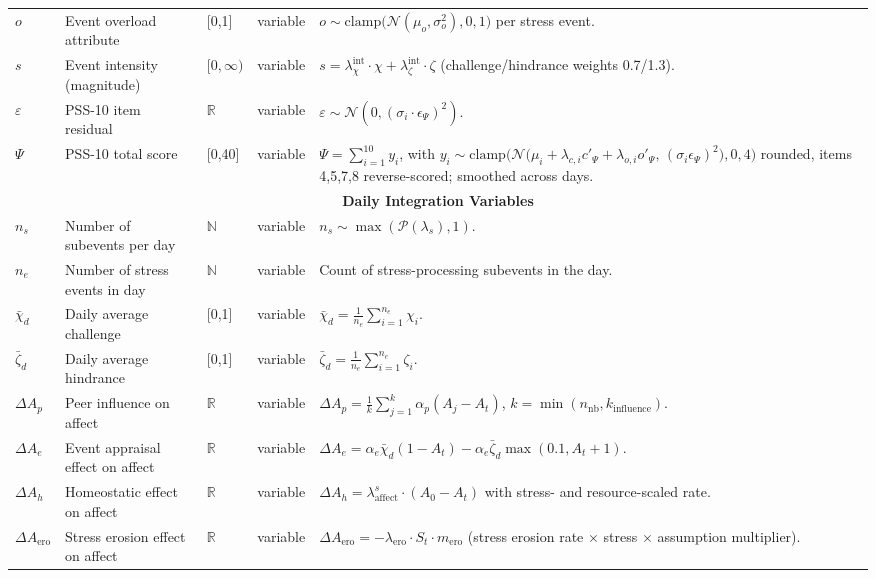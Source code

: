 \documentclass[
  letterpaper,
  DIV=11,
  numbers=noendperiod]{scrartcl}
\begin{document}
\begin{longtable}{lp{2.4cm}p{1.6cm}p{1.7cm}p{5.2cm}}
$o$ & Event overload attribute & [0,1] & variable & $o \sim \mathrm{clamp}\big(\mathcal{N}(\mu_o, \sigma_o^2), 0, 1\big)$ per stress event. \\
$s$ & Event intensity (magnitude) & $[0,\infty)$ & variable & $s = \lambda_{\chi}^{\mathrm{int}} \cdot \chi + \lambda_{\zeta}^{\mathrm{int}} \cdot \zeta$ (challenge/hindrance weights 0.7/1.3). \\
$\varepsilon$ & PSS-10 item residual & $\mathbb{R}$ & variable & $\varepsilon \sim \mathcal{N}(0, (\sigma_i \cdot \epsilon_{\Psi})^2)$. \\
$\Psi$ & PSS-10 total score & [0,40] & variable & $\Psi = \sum_{i=1}^{10} y_i$, with $y_i \sim \mathrm{clamp}\big(\mathcal{N}\big(\mu_i + \lambda_{c,i}c'_\Psi + \lambda_{o,i}o'_\Psi,\, (\sigma_i \epsilon_{\Psi})^2\big), 0, 4\big)$ rounded, items 4,5,7,8 reverse-scored; smoothed across days. \\
\midrule
\multicolumn{5}{c}{\textbf{Daily Integration Variables}} \\
\midrule
$n_s$ & Number of subevents per day & $\mathbb{N}$ & variable & $n_s \sim \max(\mathcal{P}(\lambda_s), 1)$. \\
$n_e$ & Number of stress events in day & $\mathbb{N}$ & variable & Count of stress-processing subevents in the day. \\
$\bar{\chi}_d$ & Daily average challenge & [0,1] & variable & $\bar{\chi}_d = \frac{1}{n_e}\sum_{i=1}^{n_e}\chi_i$. \\
$\bar{\zeta}_d$ & Daily average hindrance & [0,1] & variable & $\bar{\zeta}_d = \frac{1}{n_e}\sum_{i=1}^{n_e}\zeta_i$. \\
$\Delta A_p$ & Peer influence on affect & $\mathbb{R}$ & variable & $\Delta A_p = \frac{1}{k}\sum_{j=1}^{k} \alpha_p (A_j - A_t)$, $k = \min(n_{\mathrm{nb}}, k_{\mathrm{influence}})$. \\
$\Delta A_e$ & Event appraisal effect on affect & $\mathbb{R}$ & variable & $\Delta A_e = \alpha_e \bar{\chi}_d (1 - A_t) - \alpha_e \bar{\zeta}_d \max(0.1, A_t + 1)$. \\
$\Delta A_h$ & Homeostatic effect on affect & $\mathbb{R}$ & variable & $\Delta A_h = \lambda_{\mathrm{affect}}^s \cdot (A_0 - A_t)$ with stress- and resource-scaled rate. \\
$\Delta A_{\mathrm{ero}}$ & Stress erosion effect on affect & $\mathbb{R}$ & variable & $\Delta A_{\mathrm{ero}} = -\lambda_{\mathrm{ero}} \cdot S_t \cdot m_{\mathrm{ero}}$ (stress erosion rate $\times$ stress $\times$ assumption multiplier). \\

\end{longtable}
\end{document}
